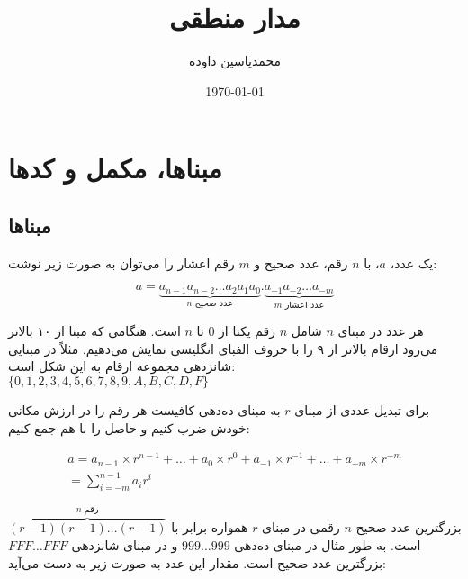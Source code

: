 \documentclass[a5paper]{article}
\author{محمدیاسین داوده}
\title{مدار منطقی}
\date{\today}
\begin{document}
\begin{titlingpage}
\maketitle


\tableofcontents
\end{titlingpage}

\section{مبناها، مکمل و کدها}
\subsection{مبناها}
یک عدد، $a$، با $n$ رقم، عدد صحیح و $m$ رقم اعشار را می‌توان به صورت زیر نوشت:

\begin{equation}
  a = \underbrace{a_{n-1}a_{n-2} \ldots a_2a_1a_0}_{\text{$n$ عدد صحیح}}.\underbrace{a_{-1}a_{-2} \ldots a_{-m}}_{\text{$m$ عدد اعشار}}
\end{equation}

هر عدد در مبنای $n$ شامل $n$ رقم یکتا از $0$ تا $n$ است.
هنگامی که مبنا از ۱۰ بالاتر می‌رود ارقام بالاتر از ۹ را با حروف الفبای انگلیسی نمایش می‌دهیم.
مثلاً در مبنایی شانزدهی مجموعه ارقام به این شکل است:\\
$\{0,1,2,3,4,5,6,7,8,9,A,B,C,D,F\}$

برای تبدیل عددی از مبنای $r$ به مبنای ده‌دهی کافیست هر رقم را در
ارزش مکانی خودش ضرب کنیم و حاصل را با هم جمع کنیم:

\begin{equation}\begin{split}
  a = a_{n-1} \times r^{n-1} + \ldots + a_{0} \times r^{0} + a_{-1} \times r^{-1} + \ldots + a_{-m} \times r^{-m}\\
  = \sum_{i=-m}^{n-1}a_{i}r^{i}
\end{split}\end{equation}

بزرگترین عدد صحیح $n$ رقمی در مبنای $r$ همواره برابر با $\overbrace{(r-1)(r-1)\ldots(r-1)}^{\text{$n$ رقم}}$ است.
به طور مثال در مبنای ده‌دهی $999\ldots999$ و در مبنای شانزدهی $FFF\ldots{}FFF$ بزرگترین عدد صحیح است.
مقدار این عدد به صورت زیر به دست می‌آید:
\end{document}
